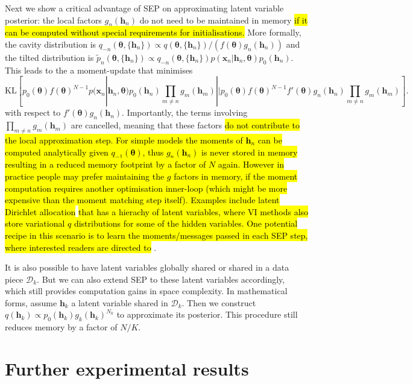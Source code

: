 \documentclass{article} %
\begin{document}
Next we show a critical advantage of SEP on approximating latent variable posterior: the local factors $g_n(\bm{h}_n)$ do not need to be maintained in memory \hl{if it can be computed without special requirements for initialisations.} 
%
More formally, the cavity distribution is $q_{-n}(\bm{\theta}, \{ \bm{h}_n\}) \propto q(\bm{\theta}, \{ \bm{h}_n\})/(f(\bm{\theta}) g_n(\bm{h}_n)) $ and the tilted distribution is $\tilde{p}_n(\bm{\theta}, \{ \bm{h}_n\}) \propto q_{-n}(\bm{\theta}, \{ \bm{h}_n\}) p(\bm{x}_n | \bm{h}_n, \bm{\theta})p_0(\bm{h}_n)$. This leads to the a moment-update that minimises 
%
\begin{equation}
\mathrm{KL}[ p_0(\bm{\theta}) f(\bm{\theta})^{N-1} p(\bm{x}_n | \bm{h}_n, \bm{\theta})p_0(\bm{h}_n) \prod_{m\ne n} g_m(\bm{h}_m) || p_0(\bm{\theta}) f(\bm{\theta})^{N-1} f'(\bm{\theta}) g_n(\bm{h}_n) \prod_{m\ne n} g_m(\bm{h}_m)] .\nonumber
\end{equation}
%
with respect to $f'(\bm{\theta}) g_n(\bm{h}_n)$. Importantly, the terms involving $\prod_{m\ne n} g_m(\bm{h}_m)$ are cancelled, meaning that these factors \hl{do not contribute to the local approximation step. For simple models the moments of $\bm{h}_n$ can be computed analytically given $q_{-1}(\bm{\theta})$, thus $g_n(\bm{h}_n)$ is never stored in memory resulting in a reduced memory footprint by a factor of $N$ again. However in practice people may prefer maintaining the $g$ factors in memory, if the moment computation requires another optimisation inner-loop (which might be more expensive than the moment matching step itself). Examples include latent Dirichlet allocation} \cite{blei:lda} \hl{that has a hierachy of latent variables, where VI methods also store variational $q$ distributions for some of the hidden variables. One potential recipe in this scenario is to learn the moments/messages passed in each SEP step, where interested readers are directed to} \cite{heess:learning_messages, jitkrittum:kernel}.

It is also possible to have latent variables globally shared or shared in a data piece $\mathcal{D}_k$. But we can also extend SEP to these latent variables accordingly, which still provides computation gains in space complexity. In mathematical forms, assume $\bm{h}_k$ a latent variable shared in $\mathcal{D}_k$. Then we construct $q(\bm{h}_k) \propto p_0(\bm{h}_k) g_k(\bm{h}_k)^{N_k}$ to approximate its posterior. This procedure still reduces memory by a factor of $N/K$.

\section{Further experimental results}
\end{document}
